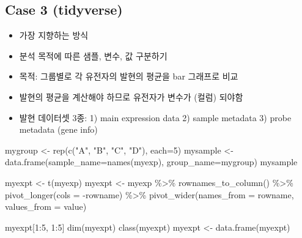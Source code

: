 \documentclass[
]{book}
\newenvironment{Shaded}{\begin{snugshade}}{\end{snugshade}}
\newcommand{\AttributeTok}[1]{\textcolor[rgb]{0.77,0.63,0.00}{#1}}
\newcommand{\DecValTok}[1]{\textcolor[rgb]{0.00,0.00,0.81}{#1}}
\newcommand{\FunctionTok}[1]{\textcolor[rgb]{0.00,0.00,0.00}{#1}}
\newcommand{\NormalTok}[1]{#1}
\newcommand{\OtherTok}[1]{\textcolor[rgb]{0.56,0.35,0.01}{#1}}
\newcommand{\SpecialCharTok}[1]{\textcolor[rgb]{0.00,0.00,0.00}{#1}}
\newcommand{\StringTok}[1]{\textcolor[rgb]{0.31,0.60,0.02}{#1}}
\providecommand{\tightlist}{%
  \setlength{\itemsep}{0pt}\setlength{\parskip}{0pt}}
\begin{document}
\hypertarget{case-3-tidyverse}{%
\subsection{Case 3 (tidyverse)}\label{case-3-tidyverse}}

\begin{itemize}
\tightlist
\item
  가장 지향하는 방식
\item
  분석 목적에 따른 샘플, 변수, 값 구분하기
\item
  목적: 그룹별로 각 유전자의 발현의 평균을 bar 그래프로 비교
\item
  발현의 평균을 계산해야 하므로 유전자가 변수가 (컬럼) 되야함
\item
  발현 데이터셋 3종: 1) main expression data 2) sample metadata 3) probe metadata (gene info)
\end{itemize}

\begin{Shaded}
\begin{Highlighting}[]
\NormalTok{mygroup }\OtherTok{\textless{}{-}} \FunctionTok{rep}\NormalTok{(}\FunctionTok{c}\NormalTok{(}\StringTok{"A"}\NormalTok{, }\StringTok{"B"}\NormalTok{, }\StringTok{"C"}\NormalTok{, }\StringTok{"D"}\NormalTok{), }\AttributeTok{each=}\DecValTok{5}\NormalTok{)}
\NormalTok{mysample }\OtherTok{\textless{}{-}} \FunctionTok{data.frame}\NormalTok{(}\AttributeTok{sample\_name=}\FunctionTok{names}\NormalTok{(myexp), }\AttributeTok{group\_name=}\NormalTok{mygroup)}
\NormalTok{mysample}


\NormalTok{myexpt }\OtherTok{\textless{}{-}} \FunctionTok{t}\NormalTok{(myexp)}
\NormalTok{myexpt }\OtherTok{\textless{}{-}}\NormalTok{ myexp }\SpecialCharTok{\%\textgreater{}\%} 
  \FunctionTok{rownames\_to\_column}\NormalTok{() }\SpecialCharTok{\%\textgreater{}\%} 
  \FunctionTok{pivot\_longer}\NormalTok{(}\AttributeTok{cols =} \SpecialCharTok{{-}}\NormalTok{rowname) }\SpecialCharTok{\%\textgreater{}\%} 
  \FunctionTok{pivot\_wider}\NormalTok{(}\AttributeTok{names\_from =}\NormalTok{ rowname, }\AttributeTok{values\_from =}\NormalTok{ value)}



\NormalTok{myexpt[}\DecValTok{1}\SpecialCharTok{:}\DecValTok{5}\NormalTok{, }\DecValTok{1}\SpecialCharTok{:}\DecValTok{5}\NormalTok{]}
\FunctionTok{dim}\NormalTok{(myexpt)}
\FunctionTok{class}\NormalTok{(myexpt)}
\NormalTok{myexpt }\OtherTok{\textless{}{-}} \FunctionTok{data.frame}\NormalTok{(myexpt)}
\end{Highlighting}
\end{Shaded}
\end{document}
